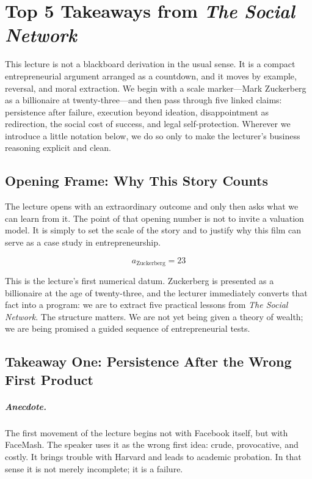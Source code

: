 \chapter{Top 5 Takeaways from \emph{The Social Network}}

This lecture is not a blackboard derivation in the usual sense. It is a compact entrepreneurial argument arranged as a countdown, and it moves by example, reversal, and moral extraction. We begin with a scale marker---Mark Zuckerberg as a billionaire at twenty-three---and then pass through five linked claims: persistence after failure, execution beyond ideation, disappointment as redirection, the social cost of success, and legal self-protection. Wherever we introduce a little notation below, we do so only to make the lecturer's business reasoning explicit and clean.

\section{Opening Frame: Why This Story Counts}

The lecture opens with an extraordinary outcome and only then asks what we can learn from it. The point of that opening number is not to invite a valuation model. It is simply to set the scale of the story and to justify why this film can serve as a case study in entrepreneurship.

\begin{equation}
a_{\text{Zuckerberg}} = 23
\end{equation}

This is the lecture's first numerical datum. Zuckerberg is presented as a billionaire at the age of twenty-three, and the lecturer immediately converts that fact into a program: we are to extract five practical lessons from \emph{The Social Network}. The structure matters. We are not yet being given a theory of wealth; we are being promised a guided sequence of entrepreneurial tests.

\section{Takeaway One: Persistence After the Wrong First Product}

\paragraph{Anecdote.}
The first movement of the lecture begins not with Facebook itself, but with FaceMash. The speaker uses it as the wrong first idea: crude, provocative, and costly. It brings trouble with Harvard and leads to academic probation. In that sense it is not merely incomplete; it is a failure.

